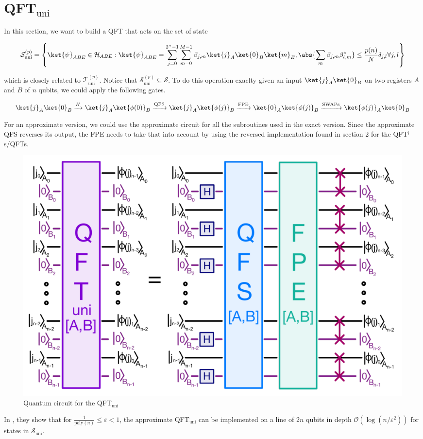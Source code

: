 \newpage
\section{QFT$_{\text{uni}}$}
In this section, we want to build a QFT that acts on the set of state 

\begin{equation}
    \mathcal{S}_{\text{uni}}^{(p)} = \left\{\ket{\psi}_{ABE} \in \mathcal{H}_{ABE} : \ket{\psi}_{ABE} = \sum_{j=0}^{2^n -1}\sum_{m=0}^{M-1}\beta_{j,m}\ket{j}_A\ket{0}_B\ket{m}_E, \abs{\sum_{m}\beta_{j,m}\beta^{*}_{l,m}} \leq \frac{p(n)}{N}\delta_{j,l} \forall j,l\right\}
    \label{s_uni}
\end{equation}

which is closely related to $\mathcal{T}_{\text{uni}}^{(p)}$. Notice that $\mathcal{S}_{\text{uni}}^{(p)} \subseteq \mathcal{S}$. To do this operation exaclty given an input $\ket{j}_A\ket{0}_B$ on two registers $A$ and $B$ of $n$ qubits, we could apply the following gates.

\begin{equation*}
    \ket{j}_A\ket{0}_B \xrightarrow{H} \ket{j}_A\ket{\phi(0)}_B \xrightarrow{\text{QFS}} \ket{j}_A\ket{\phi(j)}_B \xrightarrow{\text{FPE}} \ket{0}_A\ket{\phi(j)}_B \xrightarrow{\text{SWAPs}} \ket{\phi(j)}_A\ket{0}_B
\end{equation*}

For an approximate version, we could use the approximate circuit for all the subroutines used in the exact version. Since the approximate QFS reverses its output, the FPE needs to take that into account by using the reversed implementation found in section 2 for the QFT$^{\dagger}$s/QFTs.

\begin{figure}[H]
    \centering
    \includegraphics*[scale=0.55]{images/circuit_qft_uni.png}
    \caption{Quantum circuit for the QFT$_{\text{uni}}$}
    \label{circuit_qft_uni}
\end{figure}

In \cite{bäumer2025approximatequantumfouriertransform}, they show that for $\frac{1}{\text{poly}(n)} \leq \varepsilon < 1$, the approximate QFT$_{\text{uni}}$ can be implemented on a line of $2n$ qubits in depth $\mathcal{O}(\log(n/\varepsilon^2))$ for states in $\mathcal{S}_{\text{uni}}$.







